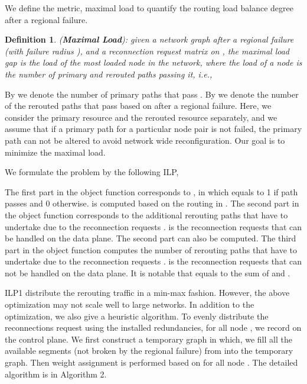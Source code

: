 \documentclass[10pt,journal]{IEEEtran}
\newtheorem{definition}{Definition}
\begin{document}
We define the metric, maximal load to quantify the routing load balance degree after a regional failure.
\begin{definition} (\textbf{Maximal Load}): given a network graph  after a regional failure (with failure radius ), and a reconnection request matrix  on , the maximal load gap is the load of the most loaded node in the network, where the load of a node is the number of primary and rerouted paths passing it, i.e.,

\end{definition}
By  we denote the number of primary paths that pass  . By  we denote the number of the rerouted paths that pass  based on  after a regional failure. Here, we consider the primary resource and the rerouted resource separately, and we assume that if a primary path for a particular node pair is not failed, the primary path can not be altered to avoid network wide reconfiguration. Our goal is to minimize the maximal load.

We formulate the problem by the following ILP,


The first part in the object function corresponds to , in which  equals to 1 if path  passes  and 0 otherwise.  is computed based on the routing in . The second part in the object function corresponds to the additional rerouting paths that  have to undertake due to the reconnection requests .  is the reconnection requests that can be handled on the data plane. The second part can also be computed. The third part in the object function computes the number of rerouting paths that  have to undertake due to the reconnection requests .  is the reconnection requests that can not be handled on the data plane. It is notable that  equals to the sum of  and .

ILP1 distribute the rerouting traffic in a min-max fashion. However, the above optimization may not scale well to large networks. In addition to the optimization, we also give a heuristic algorithm. To evenly distribute the reconnections request using the installed redundancies, for all node , we record  on the control plane. We first construct a temporary graph in which, we fill all the available segments (not broken by the regional failure) from  into the temporary graph. Then weight assignment is performed based on  for all node . The detailed algorithm is in Algorithm 2.
\end{document}
